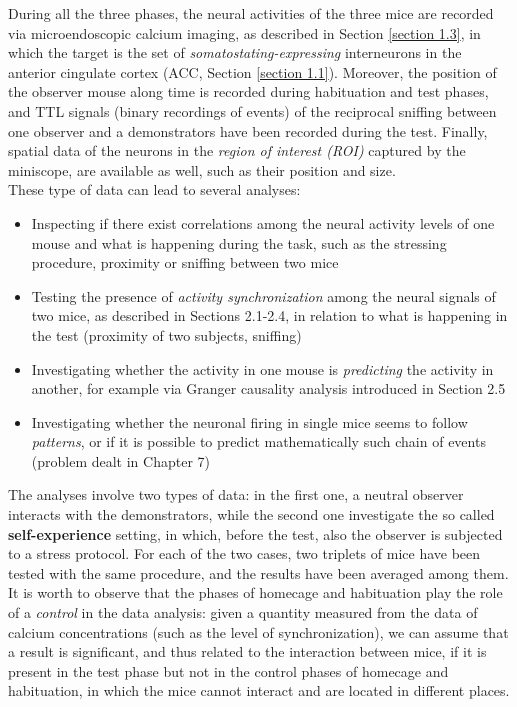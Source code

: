 \documentclass[12pt, a4paper]{article}
\begin{document}
During all the three phases, the neural activities of the three mice are recorded via microendoscopic calcium imaging, as described in Section \ref{section 1.3}, in which the target is the set of \textit{somatostating-expressing} interneurons in the anterior cingulate cortex (ACC, Section \ref{section 1.1}). Moreover, the position of the observer mouse along time is recorded during habituation and test phases, and TTL signals (binary recordings of events) of the reciprocal sniffing between one observer and a demonstrators have been recorded during the test. Finally, spatial data of the neurons in the \textit{region of interest (ROI)} captured by the miniscope, are available as well, such as their position and size.\\
These type of data can lead to several analyses:
\begin{itemize}
	
	\item Inspecting if there exist correlations among the neural activity levels of one mouse and what is happening during the task, such as the stressing procedure, proximity or sniffing between two mice
	
	\item Testing the presence of \textit{activity synchronization} among the neural signals of two mice, as described in Sections 2.1-2.4, in relation to what is happening in the test (proximity of two subjects, sniffing)
	
	\item Investigating whether the activity in one mouse is \textit{predicting} the activity in another, for example via  Granger causality analysis introduced in Section 2.5
	
	\item Investigating whether the neuronal firing in single mice seems to follow \textit{patterns}, or if it is possible to predict mathematically such chain of events (problem dealt in Chapter 7)
\end{itemize}


The analyses involve two types of data: in the first one, a neutral observer interacts with the demonstrators, while the second one investigate the so called \textbf{self-experience} setting, in which, before the test, also the observer is subjected to a stress protocol. For each of the two cases, two triplets of mice have been tested with the same procedure, and the results have been averaged among them.\\
It is worth to observe that the phases of homecage and habituation play the role of a \textit{control} in the data analysis: given a quantity measured from the data of calcium concentrations (such as the level of synchronization), we can assume that a result is significant, and thus related to the interaction between mice, if it is present in the test phase but not in the control phases of homecage and habituation, in which the mice cannot interact and are located in different places.
\end{document}

